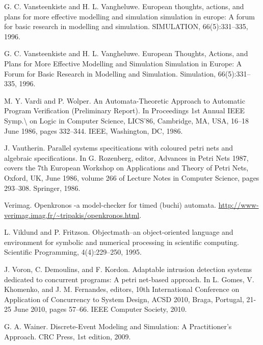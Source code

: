 \begin{description}[style=nextline,leftmargin=12mm,labelwidth=10mm,font=\normalfont]
\item[{[294]}] G. C. Vansteenkiste and H. L. Vangheluwe. European thoughts, actions, and plans for more effective modelling and simulation simulation in europe: A forum for basic research in modelling and simulation. SIMULATION, 66(5):331–335, 1996.

\item[{[295]}] G. C. Vansteenkiste and H. L. Vangheluwe. European Thoughts, Actions, and Plans for More Effective Modelling and Simulation Simulation in Europe: A Forum for Basic Research in Modelling and Simulation. Simulation, 66(5):331–335, 1996.

\item[{[296]}] M. Y. Vardi and P. Wolper. An Automata-Theoretic Approach to Automatic Program Verification (Preliminary Report). In Proceedings 1st Annual IEEE Symp.\textbackslash{} on Logic in Computer Science, LICS’86, Cambridge, MA, USA, 16–18 June 1986, pages 332–344. IEEE, Washington, DC, 1986.

\item[{[297]}] J. Vautherin. Parallel systems specitications with coloured petri nets and algebraic specifications. In G. Rozenberg, editor, Advances in Petri Nets 1987, covers the 7th European Workshop on Applications and Theory of Petri Nets, Oxford, UK, June 1986, volume 266 of Lecture Notes in Computer Science, pages 293–308. Springer, 1986.

\item[{[298]}] Verimag. Openkronos -a model-checker for timed (buchi) automata. \url{http://www-verimag.imag.fr/~tripakis/openkronos.html}.

\item[{[299]}] L. Viklund and P. Fritzson. Objectmath–an object-oriented language and environment for symbolic and numerical processing in scientific computing. Scientific Programming, 4(4):229–250, 1995.

\item[{[300]}] J. Voron, C. Demoulins, and F. Kordon. Adaptable intrusion detection systems dedicated to concurrent programs: A petri net-based approach. In L. Gomes, V. Khomenko, and J. M. Fernandes, editors, 10th International Conference on Application of Concurrency to System Design, ACSD 2010, Braga, Portugal, 21-25 June 2010, pages 57–66. IEEE Computer Society, 2010.

\item[{[301]}] G. A. Wainer. Discrete-Event Modeling and Simulation: A Practitioner’s Approach. CRC Press, 1st edition, 2009.


\end{description}
